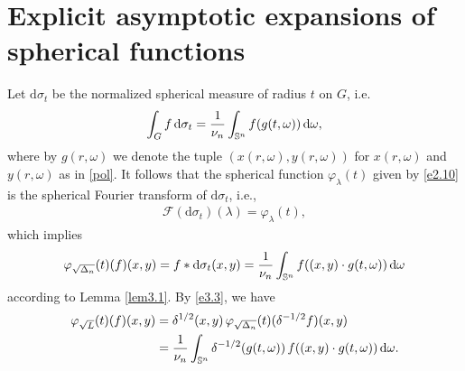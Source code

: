 \documentclass[a4paper,12pt]{amsart}
\numberwithin{equation}{section}
\theoremstyle{definition}
\theoremstyle{remark}
\numberwithin{theorem}{section}
\newcommand{\F}{\mathscr{F}}
\renewcommand{\SS}{\mathbb{S}}
\renewcommand{\d}{\mathrm{d}}
\begin{document}


\section{Explicit asymptotic expansions of spherical functions}\label{sec4}
Let $\d\sigma_t$ be the normalized spherical measure of radius $t$ on $G$, i.e.
\begin{align*}
\int_G f\,\d\sigma_t={1\over\nu_n}\int_{\SS^n}f(g(t,\omega))\,\d\omega,
\end{align*}
where by $g(r,\omega)$ we denote the tuple $(x(r,\omega),y(r,\omega))$ for $x(r,\omega)$ and $y(r,\omega)$ as in \eqref{pol}. It follows that the spherical function $\varphi_\lambda(t)$ given by \eqref{e2.10} is the spherical Fourier transform of $\d\sigma_t$, i.e.,
\begin{align*}
\F(\d\sigma_t)(\lambda)=\varphi_\lambda(t),
\end{align*}
which implies
\begin{align*}
\varphi_{\sqrt{\Delta_n}}(t)(f)(x,y)=f*\d\sigma_t(x,y)={1\over \nu_n}\int_{\SS^n}f((x,y)\cdot g(t,\omega))\,\d \omega
\end{align*}
according to Lemma \ref{lem3.1}. By \eqref{e3.3}, we have
\begin{align}
\varphi_{\sqrt{L}}(t)(f)(x,y)&=\delta^{1/2}(x,y)\,\varphi_{\sqrt{\Delta_n}}(t)(\delta^{-1/2}f)(x,y)\notag\\
&={1\over\nu_n}\int_{\SS^n}\delta^{-1/2}(g(t,\omega))\, f((x,y)\cdot g(t,\omega))\,\d \omega.\label{e4.1}
\end{align}
\smallskip
\end{document}
